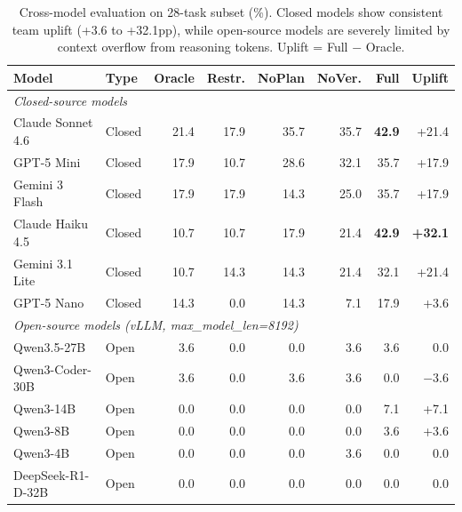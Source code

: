 \begin{table}[t]
\centering
\caption{Cross-model evaluation on 28-task subset (\%). Closed models show consistent team uplift (+3.6 to +32.1pp), while open-source models are severely limited by context overflow from reasoning tokens. Uplift = Full $-$ Oracle.}
\label{tab:cross_model_full}
\small
\begin{tabular}{llrrrrrr}
\toprule
\textbf{Model} & \textbf{Type} & \textbf{Oracle} & \textbf{Restr.} & \textbf{NoPlan} & \textbf{NoVer.} & \textbf{Full} & \textbf{Uplift} \\
\midrule
\multicolumn{8}{l}{\textit{Closed-source models}} \\
Claude Sonnet 4.6    & Closed & 21.4 & 17.9 & 35.7 & 35.7 & \textbf{42.9} & +21.4 \\
GPT-5 Mini           & Closed & 17.9 & 10.7 & 28.6 & 32.1 & 35.7 & +17.9 \\
Gemini 3 Flash       & Closed & 17.9 & 17.9 & 14.3 & 25.0 & 35.7 & +17.9 \\
Claude Haiku 4.5     & Closed & 10.7 & 10.7 & 17.9 & 21.4 & \textbf{42.9} & \textbf{+32.1} \\
Gemini 3.1 Lite      & Closed & 10.7 & 14.3 & 14.3 & 21.4 & 32.1 & +21.4 \\
GPT-5 Nano           & Closed & 14.3 &  0.0 & 14.3 &  7.1 & 17.9 &  +3.6 \\
\midrule
\multicolumn{8}{l}{\textit{Open-source models (vLLM, max\_model\_len=8192)}} \\
Qwen3.5-27B          & Open   &  3.6 &  0.0 &  0.0 &  3.6 &  3.6 &  0.0 \\
Qwen3-Coder-30B      & Open   &  3.6 &  0.0 &  3.6 &  3.6 &  0.0 & $-$3.6 \\
Qwen3-14B            & Open   &  0.0 &  0.0 &  0.0 &  0.0 &  7.1 & +7.1 \\
Qwen3-8B             & Open   &  0.0 &  0.0 &  0.0 &  0.0 &  3.6 & +3.6 \\
Qwen3-4B             & Open   &  0.0 &  0.0 &  0.0 &  3.6 &  0.0 &  0.0 \\
DeepSeek-R1-D-32B    & Open   &  0.0 &  0.0 &  0.0 &  0.0 &  0.0 &  0.0 \\
\bottomrule
\end{tabular}
\vspace{-2mm}
\end{table}
